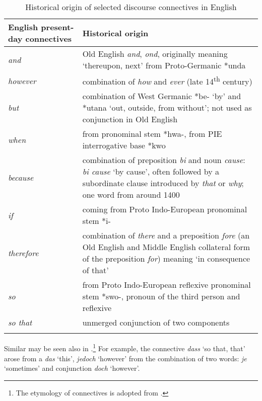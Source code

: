 \documentclass[output=paper]{langsci/langscibook.cls}
\begin{document}
\begin{table}[p]
\begin{tabularx}{\textwidth}{>{\raggedright}lX}
\lsptoprule
{English present-day connectives} &
{Historical origin}\\
\midrule
 \textit{and} &
 Old English \textit{and}, \textit{ond}, originally meaning `thereupon, next' from Proto-Germanic *unda\\
 \tablevspace
 \textit{however} &
 combination of \textit{how} and \textit{ever} (late 14\textsuperscript{th} century)\\
 \tablevspace
 \textit{but} &
 combination of West Germanic *be- `by' and *utana `out, outside, from without'; not used as conjunction in Old English\\
 \tablevspace
 \textit{when} &
 from pronominal stem *hwa-, from PIE interrogative base *kwo\\
 \tablevspace
 \textit{because} &
 combination of preposition \textit{bi} and noun \textit{cause}: \textit{bi cause} `by cause', often followed by a subordinate clause introduced by \textit{that} or \textit{why}; one word from around 1400\\
 \tablevspace
 \textit{if} &
 coming from Proto Indo-European pronominal stem *i- \\
 \tablevspace
 \textit{therefore} &
 combination of \textit{there} and a preposition \textit{fore} (an Old English and Middle English collateral form of the preposition\textit{ for}) meaning `in consequence of that'\\
 \tablevspace
 \textit{so} &
 from Proto Indo-European reflexive pronominal stem *swo-, pronoun of the third person and reflexive\\
 \tablevspace
 \textit{so that} &
 unmerged conjunction of two components\\
\lspbottomrule
\end{tabularx}
\caption{Historical origin of selected discourse connectives in English}
\label{tab:histOriginEN}
\end{table}


Similar  may be seen also in .\footnote{ The etymology of  connectives is adopted from	\citet{klein2010digitale}.} For example, the connective\textit{ dass }`so that, that' arose from a  \textit{das} `this', \textit{jedoch }`however' from the combination of two words: \textit{je} `sometimes' and conjunction \textit{doch} `however'. 
\end{document}
